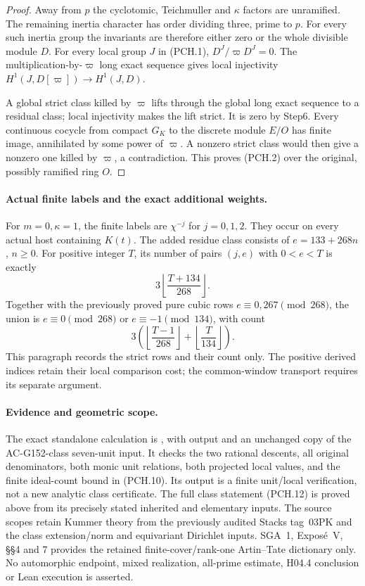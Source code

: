 \begin{proof}
Away from $p$ the cyclotomic, Teichmuller and $\kappa$ factors
are unramified.  The remaining inertia character has order
dividing three, prime to $p$.
For every such inertia group the invariants are therefore either
zero or the whole divisible module $D$.
For every local group $J$ in (PCH.1),
$D^J/\varpi D^J=0$.
The multiplication-by-$\varpi$ long exact sequence gives local
injectivity $H^1(J,D[\varpi])\to H^1(J,D)$.

A global strict class killed by $\varpi$ lifts through the global
long exact sequence to a residual class; local injectivity makes
the lift strict.  It is zero by Step6.
Every continuous cocycle from compact $G_K$ to the discrete
module $E/O$ has finite image, annihilated by some power of
$\varpi$.  A nonzero strict class would then give a nonzero one
killed by $\varpi$, a contradiction.
This proves (PCH.2) over the original, possibly ramified ring $O$.
\end{proof}

\paragraph{Actual finite labels and the exact additional weights.}
For $m=0,\kappa=1$, the finite labels are $\chi^{-j}$ for
$j=0,1,2$.  They occur on every actual host containing $K(t)$.
The added residue class consists of $e=133+268n$, $n\geq0$.
For positive integer $T$, its number of pairs $(j,e)$ with
$0<e<T$ is exactly
\[
                         3\left\lfloor\frac{T+134}{268}\right\rfloor.
 \tag{PCH.22}
\]
Together with the previously proved pure cubic rows
$e\equiv0,267\pmod{268}$, the union is
$e\equiv0\pmod{268}$ or $e\equiv-1\pmod{134}$, with count
\[
             3\left(\left\lfloor\frac{T-1}{268}\right\rfloor
                     +\left\lfloor\frac T{134}\right\rfloor\right).
 \tag{PCH.23}
\]
This paragraph records the strict rows and their count only.
The positive derived indices retain their local comparison cost;
the common-window transport requires its separate argument.

\paragraph{Evidence and geometric scope.}
The exact standalone calculation is
, with output
 and an unchanged copy
of the AC-G152-class seven-unit input.
It checks the two rational descents, all original denominators,
both monic unit relations, both projected local values, and the
finite ideal-count bound in (PCH.10).
Its output is a finite unit/local verification, not a new analytic
class certificate.  The full class statement (PCH.12) is proved
above from its precisely stated inherited and elementary inputs.
The source scopes retain Kummer theory from the previously audited
Stacks tag~03PK and the class extension/norm and equivariant
Dirichlet inputs.  SGA~1, Expos\'e~V, \S\S4 and 7 provides the
retained finite-cover/rank-one Artin--Tate dictionary only.
No automorphic endpoint, mixed realization, all-prime estimate,
H04.4 conclusion or Lean execution is asserted.
